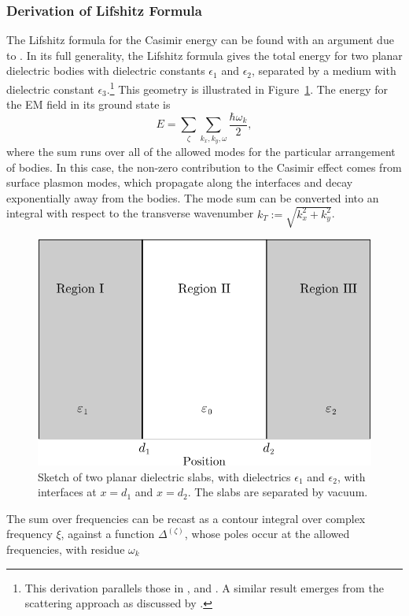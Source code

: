 \subsubsection{Derivation of Lifshitz Formula}
\label{sec:lifshitz}
The Lifshitz formula for the Casimir energy can be found with an argument due to \citet{vanKampen1968}.
In its full generality, the Lifshitz formula gives the total energy for two planar dielectric bodies with dielectric constants 
$\epsilon_1$ and $\epsilon_2$,
separated by a medium with dielectric constant $\epsilon_3$.\footnote{This derivation parallels those in \citet[Section~7.2]{Milonni1994}, and \citet[Ch.~12]{Bordag2009}.
A similar result emerges from the scattering approach as discussed by \citet{Lambrecht2011}.}
This geometry is illustrated in Figure~\ref{fig:twoslab}.
The energy for the EM field in its ground state is 
\begin{equation}
  E = \sum_{\zeta}\sum_{k_x,k_y,\omega} \frac{\hbar\omega_k}{2},
\end{equation}
where the sum runs over all of the allowed modes for the particular arrangement of bodies.  
In this case, the  non-zero contribution to the Casimir effect comes from surface plasmon modes, which propagate along the interfaces
and decay exponentially away from the bodies.  
The mode sum can be converted into an integral with respect to the transverse wavenumber $k_T:=\sqrt{k_x^2+k_y^2}$.
\begin{figure}
  \centering
  \includegraphics[width=0.6\linewidth]{fig/analytical/twoslab_ch3}
  \caption[Sketch of two planar dielectric slabs]{
    Sketch of two planar dielectric slabs, with dielectrics $\epsilon_1$ and $\epsilon_2$, with interfaces at $x=d_1$ and $x=d_2$.
    The slabs are separated by vacuum.}
  \label{fig:twoslab}
\end{figure}
The sum over frequencies can be recast as a contour integral over complex frequency $\xi$, against a function $\Delta^{(\zeta)}$,
 whose poles occur at the allowed frequencies, with residue $\omega_k$  
